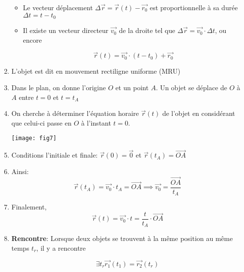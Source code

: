 \documentclass[
    11pt,
    a4paper,
    oneside,
    headinlcude, footinclude,
    twoside,
]{report}
\renewcommand{\vec}[1]{\overrightarrow{#1}}
\begin{document}
\begin{enumerate}
\begin{itemize}
\item Le vecteur déplacement $\Delta \vec r = \vec r (t) -
\vec{r_{0}}$ est proportionnelle à sa durée $\Delta t = t -
t_{0}$

\item Il existe un vecteur directeur $\vec{v_{0}}$ de la droite
tel que $\Delta \vec r = \vec{v_{0}} \cdot \Delta t$, ou
encore 

\begin{equation}
\vec r (t) = \vec{v_{0}} \cdot (t - t_{0}) + \vec{r_{0}} 
\label{eq:2.7}
\end{equation}
\end{itemize}

\item L'objet est dit en mouvement rectiligne uniforme (MRU)

\item Dans le plan, on donne l'origine $O$ et un point $A$. Un objet
se déplace de $O$ à $A$ entre $t = 0$ et $t = t_{A}$

\item On cherche à déterminer l'équation horaire $\vec r (t)$ de
l'objet en considérant que celui-ci passe en $O$ à l'instant $t =
0$.

\begin{center}
\texttt{[image: fig7]}
\end{center}

\item Conditions l'initiale et finale: $\vec r (0) = \vec 0$ et $\vec
r (t_{A}) = \vec{OA}$

\item Ainsi: 
\begin{equation}
\vec r (t_{A}) = \vec{v_{0}} \cdot t_{A} = \vec{OA} \implies
\vec{v_{0}} = \frac{\vec{OA}}{t_{A}}
\end{equation}

\item Finalement, \begin{equation}\vec r (t) = \vec{v_{0}} \cdot t = \frac{t}{t_{A}}
\cdot \vec{OA}\end{equation}

\item \textbf{Rencontre}: Lorsque deux objets se trouvent à la même
position au même temps $t_{r}$, il y a rencontre

\begin{equation}
\exists t_{r} \vec{r_{1}} (t_{1}) = \vec{r_{2}} (t_{r})
\end{equation}
\end{enumerate}
\end{document}
